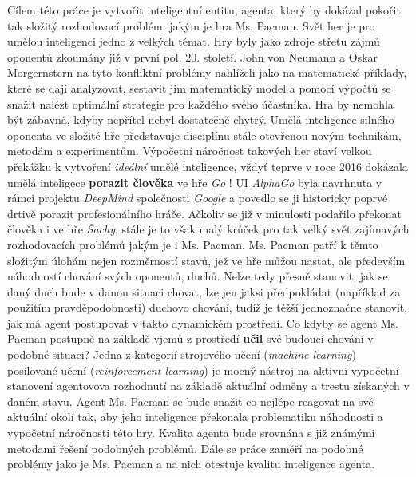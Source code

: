 Cílem této práce je vytvořit inteligentní entitu, agenta, který by dokázal pokořit tak složitý rozhodovací problém, jakým je hra Ms. Pacman. Svět her je pro umělou inteligenci jedno z velkých témat. Hry byly jako zdroje střetu zájmů oponentů zkoumány již v první pol. 20. století. John von Neumann a Oskar Morgernstern na tyto konfliktní problémy nahlíželi jako na matematické příklady, které se dají analyzovat, sestavit jim matematický model a pomocí výpočtů se snažit nalézt optimální strategie pro každého svého účastníka. Hra by nemohla být zábavná, kdyby nepřítel nebyl dostatečně chytrý. Umělá inteligence silného oponenta ve složité hře představuje disciplínu stále otevřenou novým technikám, metodám a experimentům. Výpočetní náročnost takových her staví velkou překážku k vytvoření \textit{ideální} umělé inteligence, vždyť teprve v roce 2016 dokázala umělá inteligece \textbf{porazit člověka} ve hře \textit{Go} \cite{uigo}! UI \textit{AlphaGo} byla navrhnuta v rámci projektu \textit{DeepMind} společnosti \textit{Google} a povedlo se ji historicky poprvé drtivě porazit profesionálního hráče. Ačkoliv se již v minulosti podařilo překonat člověka i ve hře \textit{Šachy}, stále je to však malý krůček pro tak velký svět zajímavých rozhodovacích problémů jakým je i Ms. Pacman. Ms. Pacman patří k těmto složitým úlohám nejen rozměrností stavů, jež ve hře můžou nastat, ale především náhodností chování svých oponentů, duchů. Nelze tedy přesně stanovit, jak se daný duch bude v danou situaci chovat, lze jen jaksi předpokládat (například za použitím pravděpodobnosti) duchovo chování, tudíž je těžší jednoznačne stanovit, jak má agent postupovat v takto dynamickém prostředí. Co kdyby se agent Ms. Pacman postupně na základě vjemů z prostředí \textbf{učil} své budoucí chování v podobné situaci? 
Jedna z kategorií strojového učení (\textit{machine learning}) posilované učení (\textit{reinforcement learning}) je mocný nástroj na aktivní vypočetní stanovení agentovova rozhodnutí na základě aktuální odměny a trestu získaných v daném stavu. Agent Ms. Pacman se bude snažit co nejlépe reagovat na své aktuální okolí tak, aby jeho inteligence překonala problematiku náhodnosti a vypočetní náročnosti této hry. Kvalita agenta bude srovnána s již známými metodami řešení podobných problémů. Dále se práce zaměří na podobné problémy jako je Ms. Pacman a na nich otestuje kvalitu inteligence agenta.

